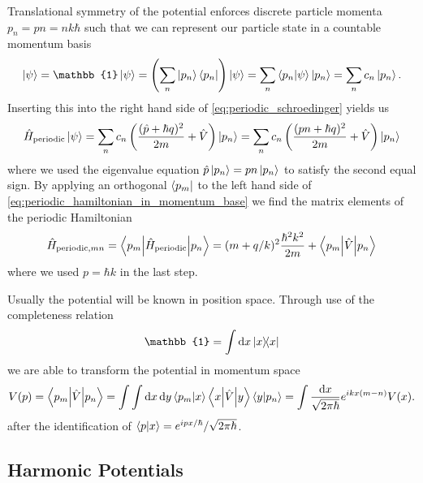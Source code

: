 Translational symmetry of the potential enforces discrete particle momenta
$p_n=pn=nk\hbar$ such that we can represent our particle state in a
countable momentum basis
\begin{equation}
  \ket{\psi}
  =\mathbb{1}\ket{\psi}
  =\left(\sum_n\ket{p_n}\bra{p_n}\right)\ket{\psi}
  =\sum_n\braket{p_n}{\psi}\ket{p_n}
  =\sum_nc_n\ket{p_n}
  \label{eq:countable_momentum_state}.
\end{equation}
Inserting this into the right hand side of \cref{eq:periodic_schroedinger}
yields us
\begin{equation}
  \hat{H}_\text{periodic}\ket{\psi}
  =\sum_nc_n\left(\frac{(\hat{p}+\hbar q)^2}{2m}+\hat{V}\right)\ket{p_n}
  =\sum_nc_n\left(\frac{(pn+\hbar q)^2}{2m}+\hat{V}\right)\ket{p_n}
  \label{eq:periodic_hamiltonian_in_momentum_base}
\end{equation}
where we used the eigenvalue equation $\hat{p}\ket{p_n}=pn\ket{p_n}$ to
satisfy the second equal sign. By applying an orthogonal $\bra{p_m}$ to the
left hand side of \cref{eq:periodic_hamiltonian_in_momentum_base} we find
the matrix elements of the periodic Hamiltonian
\begin{equation}
  \hat{H}_{\text{periodic},mn}
  =\mel**{p_m}{\hat{H}_\text{periodic}}{p_n}
  =(m+q/k)^2\frac{\hbar^2k^2}{2m}+\mel**{p_m}{\hat{V}}{p_n}
  \label{eq:periodic_hamiltonian_elements}
\end{equation}
where we used $p=\hbar k$ in the last step.

Usually the potential will be known in position space. Through use of the
completeness relation
\begin{equation}
  \mathbb{1}
  =\int\dd{x}\op{x}{x}
  \label{eq:continous_completeness_relation}
\end{equation}
we are able to transform the potential in momentum space
\begin{equation}
  V(p)
  =\mel**{p_m}{\hat{V}}{p_n}
  =\int\int\dd{x}\dd{y}\braket{p_m}{x}\mel**{x}{\hat{V}}{y}\braket{y}{p_n}
  =\int\frac{\dd{x}}{\sqrt{2\pi\hbar}}e^{ikx(m-n)}V(x)
  \label{eq:potential_fourier_transform}.
\end{equation}
after the identification of $\braket{p}{x}=e^{ipx/\hbar}/\sqrt{2\pi\hbar}$.

\subsection{Harmonic Potentials}

